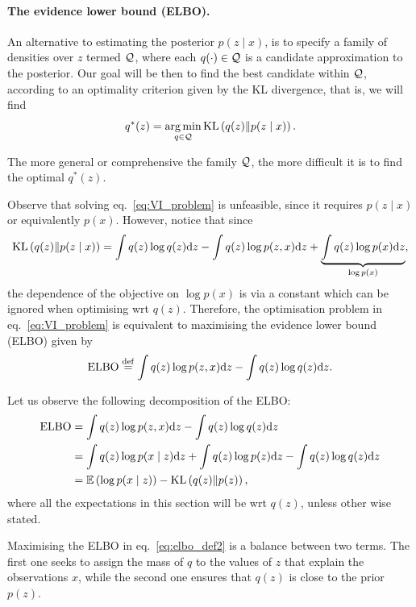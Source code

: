 \paragraph{The evidence lower bound (ELBO).} An alternative to estimating the posterior $p(z \mid x)$, is to specify a family of densities over $z$ termed ${\mathcal Q}$, where each $q(\cdot)\in{\mathcal Q}$ is a candidate approximation to the posterior. Our goal will be then to find the best candidate within ${\mathcal Q}$, according to an optimality criterion given by the KL divergence, that is, we will find
\begin{equation}
    q^*(z) = \operatorname*{arg\,min}_{q\in{\mathcal Q}} \text{KL}\left(q(z)\middle\|p(z \mid x)\right).
    \label{eq:VI_problem}
\end{equation}
\begin{remark}
    The more general or comprehensive the family ${\mathcal Q}$, the more difficult it is to find the optimal $q^*(z)$.
\end{remark}

Observe that solving eq.~\eqref{eq:VI_problem} is unfeasible, since it requires $p(z\mid x)$ or equivalently $p(x)$. However, notice that since
\[
\text{KL}\left(q(z)\middle\|p(z \mid x)\right)
=
\int q(z)\log q(z) {\text{d}z} 
-
\int q(z)\log p(z,x) {\text{d}z} 
+
\underbrace{\int q(z)\log p(x) {\text{d}z}}_{\log p(x)},
\]
the dependence of the objective on $\log p(x)$ is via a constant which can be ignored when optimising wrt $q(z)$. Therefore, the optimisation problem in eq.~\eqref{eq:VI_problem} is equivalent to maximising the evidence lower bound (ELBO) given by
\begin{equation}
    {\text{ELBO}} \mathrel{\stackrel{\mathrm{def}}{=}} \int q(z)\log p(z,x) {\text{d}z}  - \int q(z)\log q(z) {\text{d}z}.
    \label{eq:elbo_def1}
\end{equation}

Let us observe the following decomposition of the ELBO:
\begin{align}
    {\text{ELBO}} 
    &= \int q(z)\log p(z,x) {\text{d}z}  - \int q(z)\log q(z) {\text{d}z}\nonumber\\
    &= \int q(z)\log p(x \mid z) {\text{d}z} + \int q(z)\log p(z) {\text{d}z}  - \int q(z)\log q(z) {\text{d}z}\nonumber\\
    &= \mathbb{E} \left(\log p(x \mid z)\right) - \text{KL}\left(q(z)\middle\|p(z)\right),
    \label{eq:elbo_def2}
\end{align}
where all the expectations in this section will be wrt $q(z)$, unless other wise stated. 

Maximising the ELBO in eq.~\eqref{eq:elbo_def2} is a balance between two terms. The first one seeks to assign the mass of $q$ to the values of $z$ that explain the observations $x$, while the second one ensures that $q(z)$ is close to the prior $p(z)$. 

